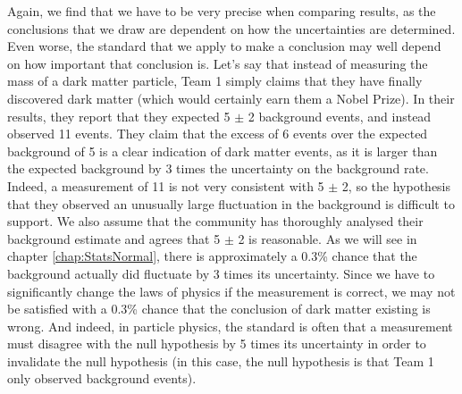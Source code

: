 Again, we find that we have to be very precise when comparing results, as the conclusions that we draw are dependent on how the uncertainties are determined. Even worse, the standard that we apply to make a conclusion may well depend on how important that conclusion is. Let's say that instead of measuring the mass of a dark matter particle, Team 1 simply claims that they have finally discovered dark matter (which would certainly earn them a Nobel Prize). In their results, they report that they expected 5 $\pm$ 2 background events, and instead observed 11 events. They claim that the excess of 6 events over the expected background of 5 is a clear indication of dark matter events, as it is larger than the expected background by 3 times the uncertainty on the background rate. Indeed, a measurement of 11 is not very consistent with 5 $\pm$ 2, so the hypothesis that they observed an unusually large fluctuation in the background is difficult to support. We also assume that the community has thoroughly analysed their background estimate and agrees that 5 $\pm$ 2 is reasonable. As we will see in chapter \ref{chap:StatsNormal}, there is approximately a 0.3\% chance that the background actually did fluctuate by 3 times its uncertainty. Since we have to significantly change the laws of physics if the measurement is correct, we may not be satisfied with a 0.3\% chance that the conclusion of dark matter existing is wrong. And indeed, in particle physics, the standard is often that a measurement must disagree with the null hypothesis by 5 times its uncertainty in order to invalidate the null hypothesis (in this case, the null hypothesis is that Team 1 only observed background events).

